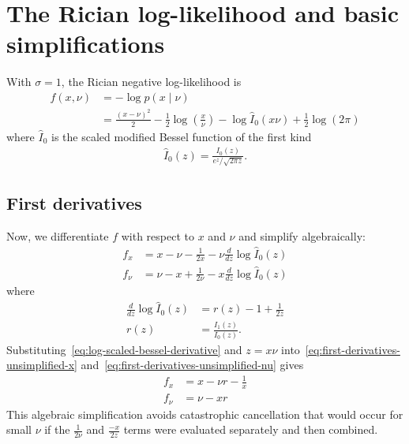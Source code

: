 \documentclass{article}
\begin{document}
\section{The Rician log-likelihood and basic simplifications}

With $\sigma=1$, the Rician negative log-likelihood is
%
\begin{align}
  f(x,\nu) & = -\log p(x\mid\nu)                                                                                               \\
           & = \frac{(x-\nu)^2}{2} - \frac{1}{2}\log\left(\frac{x}{\nu}\right) - \log \hat{I}_0(x \nu) + \frac{1}{2}\log(2\pi)
\end{align}
%
where $\hat{I}_0$ is the scaled modified Bessel function of the first kind
%
\begin{align}
  \hat{I}_0(z) = \frac{I_0(z)}{e^{z}/\sqrt{2\pi z}}.
\end{align}

\subsection{First derivatives}

Now, we differentiate $f$ with respect to $x$ and $\nu$ and simplify algebraically:
%
\begin{align}
  f_x   & = x-\nu -\frac{1}{2x} - \nu\frac{d}{dz}\log\hat{I}_0(z) \label{eq:first-derivatives-unsimplified-x}  \\
  f_\nu & = \nu-x +\frac{1}{2\nu} - x\frac{d}{dz}\log\hat{I}_0(z) \label{eq:first-derivatives-unsimplified-nu}
\end{align}
%
where
%
\begin{align}
  \frac{d}{dz}\log\hat{I}_0(z) & = r(z) - 1 + \frac{1}{2z} \label{eq:log-scaled-bessel-derivative} \\
  r(z)                         & = \frac{I_1(z)}{I_0(z)}. \label{eq:ratio-r}
\end{align}
%
Substituting~\eqref{eq:log-scaled-bessel-derivative} and $z=x\nu$ into~\eqref{eq:first-derivatives-unsimplified-x} and~\eqref{eq:first-derivatives-unsimplified-nu} gives
%
\begin{align}
  f_x   & = x - \nu r - \frac{1}{x} \label{eq:first-derivatives-simplified-x} \\
  f_\nu & = \nu - x r \label{eq:first-derivatives-simplified-nu}
\end{align}
%
This algebraic simplification avoids catastrophic cancellation that would occur for small $\nu$ if the $\frac{1}{2\nu}$ and $\frac{-x}{2z}$ terms were evaluated separately and then combined.
\end{document}
